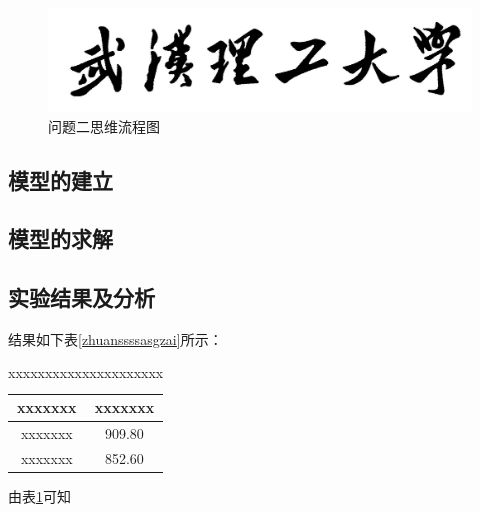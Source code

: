 \documentclass{whutmod}
\begin{document}
			\begin{figure}[H]
				\centering
				\includegraphics[width=\textwidth]{figures/whut.jpg}
				\caption{问题二思维流程图}\label{lssssct}
			\end{figure}

		\subsection{模型的建立}
		
		\subsection{模型的求解}

        \subsection{实验结果及分析}
        
			结果如下表\ref{zhuanssssasgzai}所示：
			\begin{table}[H]
			\centering		
			\caption{xxxxxxxxxxxxxxxxxxxxx}\label{biao1}
			\begin{tabular}{cc}
			\toprule[2pt]
				\multicolumn{1}{m{5cm}}{\centering xxxxxxx}
				& \multicolumn{1}{m{5cm}}{\centering xxxxxxx}
				\\
				\midrule[1pt]
				xxxxxxx &   909.80\\ 
				xxxxxxx & 	852.60\\ 
			\bottomrule[2pt]	
			\end{tabular}
			\end{table}
  
  			由表\ref{biao1}可知
\end{document}
